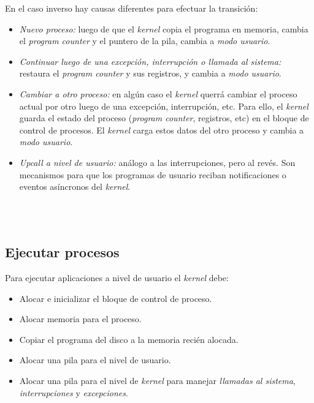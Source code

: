 \documentclass[a4paper,10pt,spanish]{article}
\begin{document}
\begin{minipage}[t]{0.45\linewidth}
\begin{itemize}
\end{itemize}

\end{minipage} \hfill \begin{minipage}[t]{0.45\linewidth}

\begin{center}
\end{center}

En el caso inverso hay causas diferentes para efectuar la transición:

\begin{itemize}
\item \textit{Nuevo proceso:} luego de que el \textit{kernel} copia el programa en memoria, cambia el \textit{program counter} y el puntero de la pila, cambia a \textit{modo usuario}.

\item \textit{Continuar luego de una excepción, interrupción o llamada al sistema:} restaura el \textit{program counter} y sus registros, y cambia a \textit{modo usuario}.

\item \textit{Cambiar a otro proceso:} en algún caso el \textit{kernel} querrá cambiar el proceso actual por otro luego de una excepción, interrupción, etc. Para ello, el \textit{kernel} guarda el estado del proceso (\textit{program counter}, registros, etc) en el bloque de control de procesos. El \textit{kernel} carga estos datos del otro proceso y cambia a \textit{modo usuario}.

\item \textit{Upcall a nivel de usuario:} análogo a las interrupciones, pero al revés. Son mecanismos para que los programas de usuario reciban notificaciones o eventos asíncronos del \textit{kernel}.
\end{itemize}

\end{minipage} \\ \\

\subsection{Ejecutar procesos}

Para ejecutar aplicaciones a nivel de usuario el \textit{kernel} debe:

\begin{itemize}
\item Alocar e inicializar el bloque de control de proceso.
\item Alocar memoria para el proceso.
\item Copiar el programa del disco a la memoria recién alocada.
\item Alocar una pila para el nivel de usuario.
\item Alocar una pila para el nivel de \textit{kernel} para manejar \textit{llamadas al sistema}, \textit{interrupciones} y \textit{excepciones}.
\end{itemize}
\end{document}
